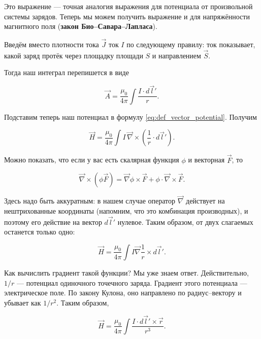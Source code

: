 \documentclass[11pt,a4paper]{article}
\numberwithin{equation}{section}
\newcommand{\vn}{\vec{\nabla}}
\begin{document}
Это выражение --- точная аналогия выражения для потенциала от
произвольной системы зарядов. Теперь мы можем получить выражение и для
напряжённости магнитного поля (\textbf{закон
  Био--Савара--Лапласа}). 

Введём вместо плотности тока $\vec{J}$ ток $I$ по следующему правилу:
ток показывает, какой заряд протёк через площадку площади $S$ и
направлением $\vec{S}$.

Тогда наш интеграл перепишется в виде

\begin{equation}
  \label{eq:der_bio-savart-laplace}
  \vec{A} = \frac{\mu_0}{4\pi} \int \frac{I \cdot d\vec{l}'}{r}.
\end{equation}

Подставим теперь наш потенциал в формулу
\eqref{eq:def_vector_potential}. Получим

\begin{equation}
  \label{eq:bio-savart-laplace_1}
  \vec{H} =\frac{\mu_0}{4\pi} \int I\, \vn \times \left( \frac{1}{r} \cdot d\vec{l}' \right).
\end{equation}

Можно показать, что если у вас есть скалярная функция $\phi$ и
векторная $\vec{F}$, то

\begin{equation}
  \label{eq:rot_prop}
  \vn \times (\phi \vec{F}) = \vn \phi \times \vec{F} + \phi \cdot \vn
  \times \vec{F}.
\end{equation}

Здесь надо быть аккуратным: в нашем случае оператор $\vn$ действует на нештрихованные
координаты (напомним, что это комбинация производных), и поэтому его
действие на вектор $d\vec{l}'$ нулевое. Таким образом, от двух
слагаемых останется только одно: 

\begin{equation}
  \label{eq:der_bio-savart-laplace_2}
  \vec{H} = \frac{\mu_0}{4\pi} \int I \vn \frac{1}{r} \times d\vec{l}'.
\end{equation}

Как вычислить градиент такой функции? Мы уже знаем
ответ. Действительно, $1/r$ --- потенциал одиночного точечного
заряда. Градиент этого потенциала --- электрическое поле. По закону
Кулона, оно направлено по радиус--вектору и убывает как $1/r^2$. Таким
образом, 

\begin{equation}
  \label{eq:der_bio-savart-laplace_3}
  \vec{H} = \frac{\mu_0}{4\pi} \int \frac{I \cdot d\vec{l}' \times \vec{r}}{r^3}.
\end{equation}
\end{document}
